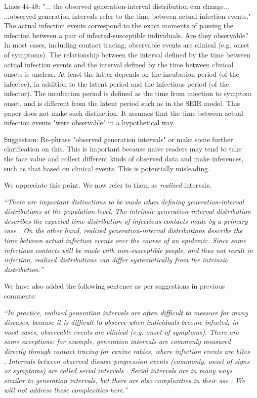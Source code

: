 \documentclass[12pt]{article}
\newcommand{\revtext}{\textsf}
\newcommand{\newtext}[1]{\textsl{``#1''}}
\begin{document}
\revtext{
Lines 44-48: "... the observed generation-interval distribution can change...
...observed generation intervals refer to the time between actual infection
events." The actual infection events correspond to the exact moments of
passing the infection between a pair of infected-susceptible individuals.
Are they observable? In most cases, including contact tracing, observable
events are clinical (e.g. onset of symptoms). The relationship between
the interval defined by the time between actual infection events and the
interval defined by the time between clinical onsets is unclear. At least the
latter depends on the incubation period (of the infectee), in addition to the
latent period and the infectious period (of the infector). The incubation
period is defined as the time from infection to symptom onset, and is
different from the latent period such as in the SEIR model. This paper
does not make such distinction. It assumes that the time between actual
infection events "were observable" in a hypothetical way.
}

\revtext{
Suggestion: Re-phrase "observed generation intervals" or make some further
clarification on this. This is important because naive readers may tend
to take the face value and collect different kinds of observed data and
make inferences, such as that based on clinical events. This is potentially
misleading.
}

We appreciate this point. We now refer to them as \emph{realized} intervals.

\newtext{There are important distinctions to be made when defining generation-interval distributions at the population-level. The \emph{intrinsic} generation-interval distribution describes the expected time distribution of infectious contacts made by a primary case \citep{champredon2015intrinsic}.
On the other hand, \emph{realized} generation-interval distributions describe the time between actual infection events over the course of an epidemic.
Since some infectious contacts will be made with non-susceptible people, and thus not result in infection, realized distributions can differ systematically from the intrinsic distribution.}

We have also added the following sentence as per suggestions in previous comments:

\newtext{In practice, realized generation intervals are often difficult to measure for many diseases, because it is difficult to observe when individuals become infected;
in most cases, observable events are clinical (e.g. onset of symptoms).
There are some exceptions: for example, generation intervals are commonly measured directly through contact tracing for canine rabies, where infection events are bites \citep{hampson2009transmission}.
Intervals between observed disease progression events (commonly, onset of signs or symptoms) are called serial intervals \citep{svensson2007note}.
Serial intervals are in many ways similar to generation intervals, but there are also complexities in their use  \citep{britton2019estimation}.
We will not address these complexities here.}
\end{document}
